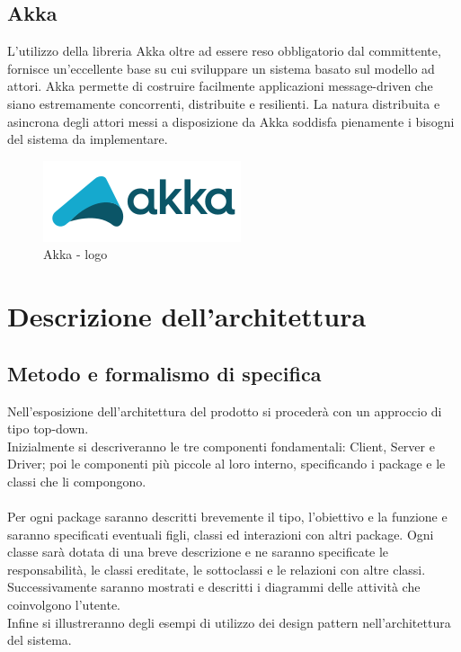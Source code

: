 \documentclass[a4paper]{article}
\begin{document}
	\subsection{Akka}
		L'utilizzo della libreria Akka oltre ad essere reso obbligatorio dal committente, fornisce un'eccellente base su cui sviluppare un sistema basato sul modello ad attori.
        Akka permette di costruire facilmente applicazioni message-driven che siano estremamente concorrenti, distribuite e resilienti.         
        La natura distribuita e asincrona degli attori messi a disposizione da Akka soddisfa pienamente i bisogni del sistema da implementare.
	\begin{figure} [H]
			\centering
			\includegraphics[width=\textwidth]{immagini/ST/Akka.png}
			\caption{Akka - logo}
		\end{figure}	
	
	
	\newpage 
	\section{Descrizione dell'architettura}
		\subsection{Metodo e formalismo di specifica}
			Nell'esposizione dell'architettura del prodotto si procederà con un approccio di tipo top-down. \\
			Inizialmente si descriveranno le tre componenti fondamentali: Client, Server e Driver; poi le componenti più piccole al loro interno, 
			specificando i package e le classi che li compongono. \\ \\
			Per ogni package saranno descritti brevemente il tipo, l'obiettivo e la funzione e saranno specificati eventuali figli, classi ed 
			interazioni con altri package. Ogni classe sarà dotata di una breve descrizione e ne saranno specificate le responsabilità, 
			le classi ereditate, le sottoclassi e le relazioni con altre classi. \\
			Successivamente saranno mostrati e descritti i diagrammi delle attività che coinvolgono l'utente. \\
			Infine si illustreranno degli esempi di utilizzo dei design pattern nell'architettura del sistema.
\end{document}

